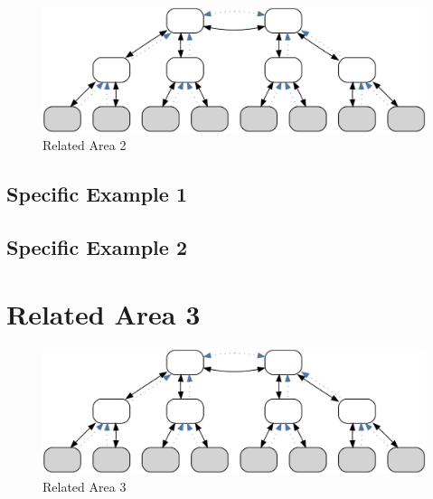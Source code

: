 

\begin{figure}[!hbtp]
    \centering
    \includegraphics[width=1\textwidth]{resources/images/example3}
    \caption{Related Area 2}\label{fig:sota:ra2}
\end{figure}


\subsection{Specific Example 1}



\subsection{Specific Example 2}







\section{Related Area 3}



\begin{figure}[!hbtp]
    \centering
    \includegraphics[width=1\textwidth]{resources/images/example3}
    \caption{Related Area 3}\label{fig:sota:ra3}
\end{figure}

